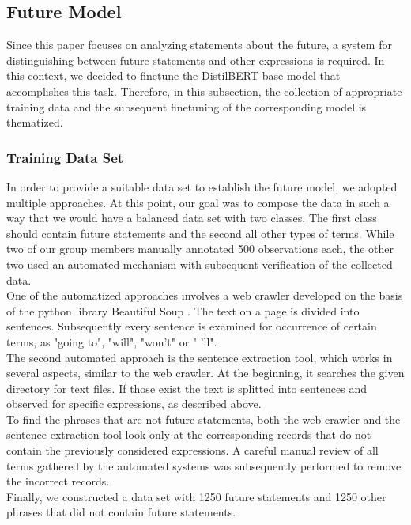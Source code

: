\documentclass[11pt]{article}
\begin{document}
\subsection{Future Model}
\label{future-model}
Since this paper focuses on analyzing statements about the future, a system for distinguishing between future statements and other expressions is required. 
In this context, we decided to finetune the DistilBERT \citep{Sanh2019DistilBERTAD} base model that accomplishes this task. Therefore, in this subsection, the collection of appropriate training data and the subsequent finetuning of the corresponding model is thematized. 

\subsubsection{Training Data Set}
\label{training}
In order to provide a suitable data set to establish the future model, we adopted multiple approaches. At this point, our goal was to compose the data in such a way that we would have a balanced data set with two classes. The first class should contain future statements and the second all other types of terms.
While two of our group members manually annotated 500 observations each, the other two used an automated mechanism with subsequent verification of the collected data. \\
One of the automatized approaches involves a web crawler developed on the basis of the python library Beautiful Soup \citep{Richardson2022}. The text on a page is divided into sentences. Subsequently every sentence is examined for occurrence of certain terms, as "going to", "will", "won't" or " 'll".\\
The second automated approach is the sentence extraction tool, which works in several aspects, similar to the web crawler. 
At the beginning, it searches the given directory for text files. If those exist the text is splitted into sentences and observed for specific expressions, as described above.\\
To find the phrases that are not future statements, both the web crawler and the sentence extraction tool look only at the corresponding records that do not contain the previously considered expressions. 
A careful manual review of all terms gathered by the automated systems was subsequently performed to remove the incorrect records. \\
Finally, we constructed a data set with 1250 future statements and 1250 other phrases that did not contain future statements.
\end{document}
